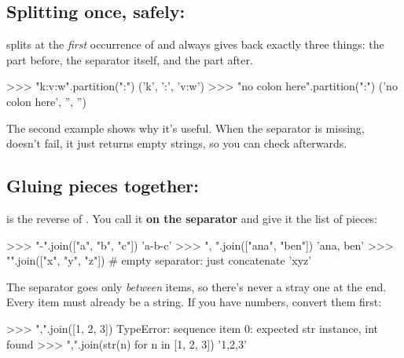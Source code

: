 \documentclass[10pt,a4paper]{article}
\begin{document}
\subsection{Splitting once, safely: }
 splits at the \emph{first} occurrence of  and always gives back exactly three things: the part before, the separator itself, and the part after.
\begin{txtcode}
>>> "k:v:w".partition(":")
('k', ':', 'v:w')
>>> "no colon here".partition(":")
('no colon here', '', '')
\end{txtcode}
The second example shows why it’s useful. When the separator is missing,  doesn’t fail, it just returns empty strings, so you can check  afterwards.
\subsection{Gluing pieces together: }
 is the reverse of . You call it \textbf{on the separator} and give it the list of pieces:
\begin{txtcode}
>>> "-".join(["a", "b", "c"])
'a-b-c'
>>> ", ".join(["ana", "ben"])
'ana, ben'
>>> "".join(["x", "y", "z"])     # empty separator: just concatenate
'xyz'
\end{txtcode}
The separator goes only \emph{between} items, so there’s never a stray one at the end. Every item must already be a string. If you have numbers, convert them first:
\begin{txtcode}
>>> ",".join([1, 2, 3])
TypeError: sequence item 0: expected str instance, int found
>>> ",".join(str(n) for n in [1, 2, 3])
'1,2,3'
\end{txtcode}
\end{document}
